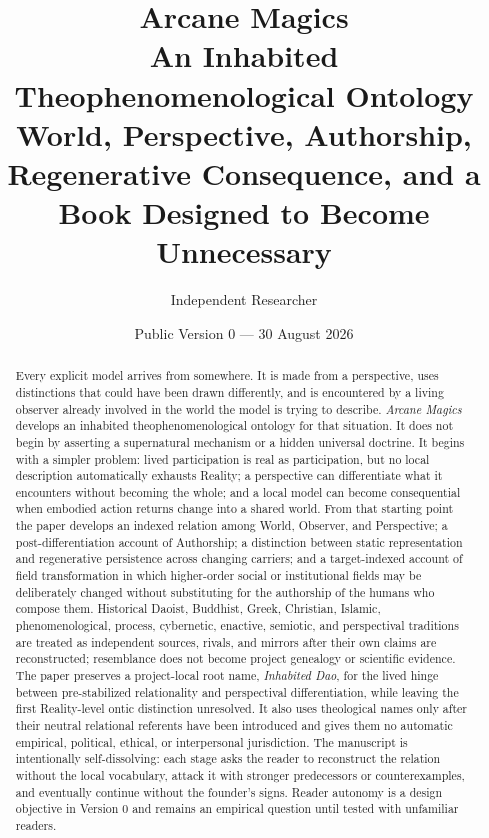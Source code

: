 \documentclass[11pt]{article}
\title{\textbf{Arcane Magics}\\
\large An Inhabited Theophenomenological Ontology\\
\normalsize World, Perspective, Authorship, Regenerative Consequence, and a Book Designed to Become Unnecessary}
\author{Independent Researcher}
\date{Public Version 0 --- 30 August 2026}
\begin{document}
\maketitle

\begin{abstract}
Every explicit model arrives from somewhere. It is made from a perspective, uses distinctions that could have been drawn differently, and is encountered by a living observer already involved in the world the model is trying to describe. \emph{Arcane Magics} develops an inhabited theophenomenological ontology for that situation. It does not begin by asserting a supernatural mechanism or a hidden universal doctrine. It begins with a simpler problem: lived participation is real as participation, but no local description automatically exhausts Reality; a perspective can differentiate what it encounters without becoming the whole; and a local model can become consequential when embodied action returns change into a shared world. From that starting point the paper develops an indexed relation among World, Observer, and Perspective; a post-differentiation account of Authorship; a distinction between static representation and regenerative persistence across changing carriers; and a target-indexed account of field transformation in which higher-order social or institutional fields may be deliberately changed without substituting for the authorship of the humans who compose them. Historical Daoist, Buddhist, Greek, Christian, Islamic, phenomenological, process, cybernetic, enactive, semiotic, and perspectival traditions are treated as independent sources, rivals, and mirrors after their own claims are reconstructed; resemblance does not become project genealogy or scientific evidence. The paper preserves a project-local root name, \emph{Inhabited Dao}, for the lived hinge between pre-stabilized relationality and perspectival differentiation, while leaving the first Reality-level ontic distinction unresolved. It also uses theological names only after their neutral relational referents have been introduced and gives them no automatic empirical, political, ethical, or interpersonal jurisdiction. The manuscript is intentionally self-dissolving: each stage asks the reader to reconstruct the relation without the local vocabulary, attack it with stronger predecessors or counterexamples, and eventually continue without the founder's signs. Reader autonomy is a design objective in Version 0 and remains an empirical question until tested with unfamiliar readers.
\end{abstract}
\end{document}
